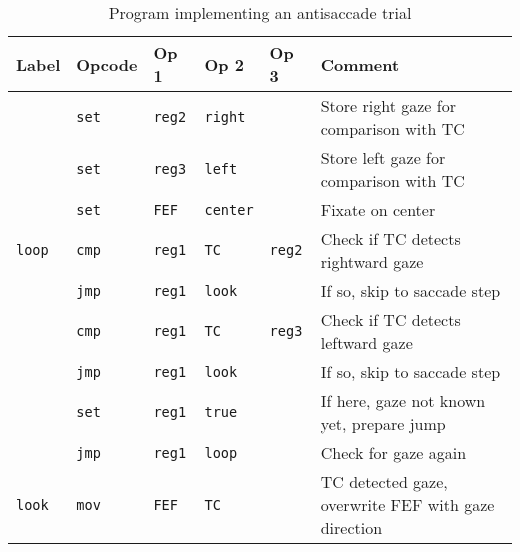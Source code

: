 \documentclass[pdftex,12pt,letterpaper]{article}
\begin{document}
\begin{table}[H]
\begin{tabularx}{\textwidth}{lllllX}
Label & Opcode & Op 1 & Op 2 & Op 3 & Comment \\
\hline
    & \texttt{set} & \texttt{reg2} & \texttt{right} & & Store right gaze for comparison with TC \\
    & \texttt{set} & \texttt{reg3} & \texttt{left} & & Store left gaze for comparison with TC \\
 & \texttt{set} & \texttt{FEF} & \texttt{center} & & Fixate on center \\
\texttt{loop} & \texttt{cmp} & \texttt{reg1} & \texttt{TC} & \texttt{reg2} & Check if TC detects rightward gaze \\
    & \texttt{jmp} & \texttt{reg1} & \texttt{look} & & If so, skip to saccade step \\
    & \texttt{cmp} & \texttt{reg1} & \texttt{TC} & \texttt{reg3} & Check if TC detects leftward gaze \\
    & \texttt{jmp} & \texttt{reg1} & \texttt{look} & & If so, skip to saccade step \\
    & \texttt{set} & \texttt{reg1} & \texttt{true} & & If here, gaze not known yet, prepare jump \\
    & \texttt{jmp} & \texttt{reg1} & \texttt{loop} & & Check for gaze again \\
\texttt{look} & \texttt{mov} & \texttt{FEF} & \texttt{TC} & & TC detected gaze, overwrite FEF with gaze direction \\
\end{tabularx}
\caption{Program implementing an antisaccade trial}
\label{tbl:aas}
\end{table}
\end{document}
